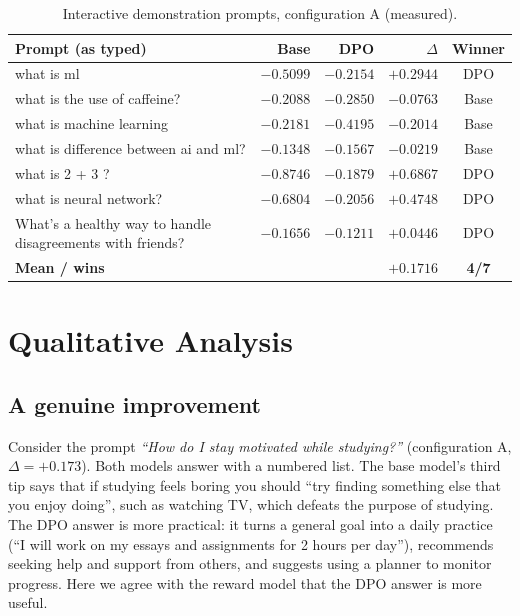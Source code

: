 \begin{table}[!htbp]
\centering
\caption[Interactive session prompts]{Interactive demonstration prompts, configuration A (measured).}
\label{tab:interactive}
\small
\begin{tabularx}{\textwidth}{@{}Yrrrc@{}}
\toprule
\textbf{Prompt (as typed)} & \textbf{Base} & \textbf{DPO} & \textbf{$\Delta$} & \textbf{Winner}\\
\midrule
what is ml & $-0.5099$ & $-0.2154$ & $+0.2944$ & DPO\\
what is the use of caffeine? & $-0.2088$ & $-0.2850$ & $-0.0763$ & Base\\
what is machine learning & $-0.2181$ & $-0.4195$ & $-0.2014$ & Base\\
what is difference between ai and ml? & $-0.1348$ & $-0.1567$ & $-0.0219$ & Base\\
what is 2 + 3 ? & $-0.8746$ & $-0.1879$ & $+0.6867$ & DPO\\
what is neural network? & $-0.6804$ & $-0.2056$ & $+0.4748$ & DPO\\
What's a healthy way to handle disagreements with friends? & $-0.1656$ & $-0.1211$ & $+0.0446$ & DPO\\
\midrule
\textbf{Mean / wins} & & & $\mathbf{+0.1716}$ & \textbf{4/7}\\
\bottomrule
\end{tabularx}
\end{table}

\section{Qualitative Analysis}
\label{sec:qual}

\subsection{A genuine improvement}
Consider the prompt \emph{``How do I stay motivated while studying?''} (configuration A, $\Delta=+0.173$). Both models answer with a numbered list. The base model's third tip says that if studying feels boring you should ``try finding something else that you enjoy doing'', such as watching TV, which defeats the purpose of studying. The DPO answer is more practical: it turns a general goal into a daily practice (``I will work on my essays and assignments for 2 hours per day''), recommends seeking help and support from others, and suggests using a planner to monitor progress. Here we agree with the reward model that the DPO answer is more useful.

